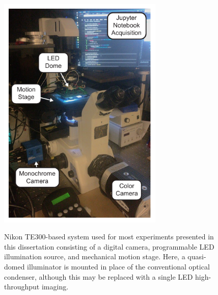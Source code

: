 \begin{figure}[bh]
    \centering
    \includegraphics[width=0.7\textwidth]{figures/fig_intro_dome_system.pdf}
    \label{fig:intro_system_dome}
    \caption{Nikon TE300-based system used for most experiments presented in this dissertation consisting of a digital camera, programmable LED illumination source, and mechanical motion stage. Here, a quasi-domed illuminator is mounted in place of the conventional optical condenser, although this may be replaced with a single LED high-throughput imaging.}
\end{figure}
